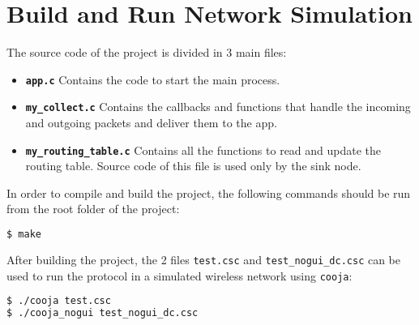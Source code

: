 \section{Build and Run Network Simulation}
\label{sec:build_and_run}

The source code of the project is divided in 3 main files:

\begin{itemize}
	\item \texttt{\textbf{app.c}} Contains the code to start the main process.
	\item \texttt{\textbf{my\_collect.c}} Contains the callbacks and functions that handle the incoming and outgoing packets and deliver them to the app.
	\item \texttt{\textbf{my\_routing\_table.c}} Contains all the functions to read and update the routing table. Source code of this file is used only by the sink node.
\end{itemize}


In order to compile and build the project, the following commands should be run from the root folder of the project:
\begin{lstlisting}[language=bash] 
$ make
\end{lstlisting}

After building the project, the 2 files \texttt{test.csc} and \texttt{test\_nogui\_dc.csc} can be used to run the protocol in a simulated wireless network using \texttt{cooja}:
\begin{lstlisting}[language=bash] 
$ ./cooja test.csc
$ ./cooja_nogui test_nogui_dc.csc
\end{lstlisting}
